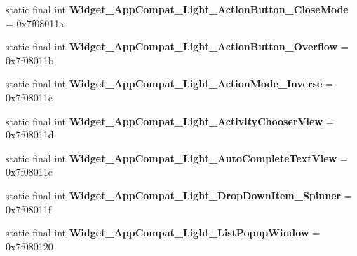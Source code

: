 \begin{DoxyCompactItemize}
\item 
\hypertarget{classandroid_1_1support_1_1v7_1_1appcompat_1_1_r_1_1style_ad3c7c2d85cd3f22d358820d04d569c21}{}static final int {\bfseries Widget\+\_\+\+App\+Compat\+\_\+\+Light\+\_\+\+Action\+Button\+\_\+\+Close\+Mode} = 0x7f08011a\label{classandroid_1_1support_1_1v7_1_1appcompat_1_1_r_1_1style_ad3c7c2d85cd3f22d358820d04d569c21}

\item 
\hypertarget{classandroid_1_1support_1_1v7_1_1appcompat_1_1_r_1_1style_add5dbe0e01ecdf1261ee66a28706a73f}{}static final int {\bfseries Widget\+\_\+\+App\+Compat\+\_\+\+Light\+\_\+\+Action\+Button\+\_\+\+Overflow} = 0x7f08011b\label{classandroid_1_1support_1_1v7_1_1appcompat_1_1_r_1_1style_add5dbe0e01ecdf1261ee66a28706a73f}

\item 
\hypertarget{classandroid_1_1support_1_1v7_1_1appcompat_1_1_r_1_1style_ae4bb55ea86baa80af869e20ee5e13385}{}static final int {\bfseries Widget\+\_\+\+App\+Compat\+\_\+\+Light\+\_\+\+Action\+Mode\+\_\+\+Inverse} = 0x7f08011c\label{classandroid_1_1support_1_1v7_1_1appcompat_1_1_r_1_1style_ae4bb55ea86baa80af869e20ee5e13385}

\item 
\hypertarget{classandroid_1_1support_1_1v7_1_1appcompat_1_1_r_1_1style_a30088bd610ce6ddc26c4b238f5fe5593}{}static final int {\bfseries Widget\+\_\+\+App\+Compat\+\_\+\+Light\+\_\+\+Activity\+Chooser\+View} = 0x7f08011d\label{classandroid_1_1support_1_1v7_1_1appcompat_1_1_r_1_1style_a30088bd610ce6ddc26c4b238f5fe5593}

\item 
\hypertarget{classandroid_1_1support_1_1v7_1_1appcompat_1_1_r_1_1style_acf51db74e8bac502d7f6b925d770ddb4}{}static final int {\bfseries Widget\+\_\+\+App\+Compat\+\_\+\+Light\+\_\+\+Auto\+Complete\+Text\+View} = 0x7f08011e\label{classandroid_1_1support_1_1v7_1_1appcompat_1_1_r_1_1style_acf51db74e8bac502d7f6b925d770ddb4}

\item 
\hypertarget{classandroid_1_1support_1_1v7_1_1appcompat_1_1_r_1_1style_afde000240c9b9a8bdd20c4e2717b4e63}{}static final int {\bfseries Widget\+\_\+\+App\+Compat\+\_\+\+Light\+\_\+\+Drop\+Down\+Item\+\_\+\+Spinner} = 0x7f08011f\label{classandroid_1_1support_1_1v7_1_1appcompat_1_1_r_1_1style_afde000240c9b9a8bdd20c4e2717b4e63}

\item 
\hypertarget{classandroid_1_1support_1_1v7_1_1appcompat_1_1_r_1_1style_abfa51aa4e5ff8b59414f140fdcb09c3f}{}static final int {\bfseries Widget\+\_\+\+App\+Compat\+\_\+\+Light\+\_\+\+List\+Popup\+Window} = 0x7f080120\label{classandroid_1_1support_1_1v7_1_1appcompat_1_1_r_1_1style_abfa51aa4e5ff8b59414f140fdcb09c3f}


\end{DoxyCompactItemize}
